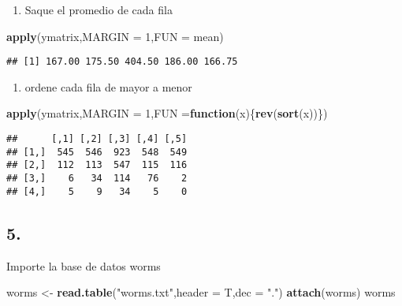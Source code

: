 \documentclass[]{article}
\newenvironment{Shaded}{\begin{snugshade}}{\end{snugshade}}
\newcommand{\KeywordTok}[1]{\textcolor[rgb]{0.13,0.29,0.53}{\textbf{#1}}}
\newcommand{\DataTypeTok}[1]{\textcolor[rgb]{0.13,0.29,0.53}{#1}}
\newcommand{\DecValTok}[1]{\textcolor[rgb]{0.00,0.00,0.81}{#1}}
\newcommand{\StringTok}[1]{\textcolor[rgb]{0.31,0.60,0.02}{#1}}
\newcommand{\ControlFlowTok}[1]{\textcolor[rgb]{0.13,0.29,0.53}{\textbf{#1}}}
\newcommand{\NormalTok}[1]{#1}
\providecommand{\tightlist}{%
  \setlength{\itemsep}{0pt}\setlength{\parskip}{0pt}}
\begin{document}
\begin{enumerate}
\def\labelenumi{\alph{enumi}.}
\tightlist
\item
  Saque el promedio de cada fila
\end{enumerate}

\begin{Shaded}
\begin{Highlighting}[]
\KeywordTok{apply}\NormalTok{(ymatrix,}\DataTypeTok{MARGIN =} \DecValTok{1}\NormalTok{,}\DataTypeTok{FUN =}\NormalTok{ mean)}
\end{Highlighting}
\end{Shaded}

\begin{verbatim}
## [1] 167.00 175.50 404.50 186.00 166.75
\end{verbatim}

\begin{enumerate}
\def\labelenumi{\alph{enumi}.}
\setcounter{enumi}{1}
\tightlist
\item
  ordene cada fila de mayor a menor
\end{enumerate}

\begin{Shaded}
\begin{Highlighting}[]
\KeywordTok{apply}\NormalTok{(ymatrix,}\DataTypeTok{MARGIN =} \DecValTok{1}\NormalTok{,}\DataTypeTok{FUN =}\ControlFlowTok{function}\NormalTok{(x)\{}\KeywordTok{rev}\NormalTok{(}\KeywordTok{sort}\NormalTok{(x))\})}
\end{Highlighting}
\end{Shaded}

\begin{verbatim}
##      [,1] [,2] [,3] [,4] [,5]
## [1,]  545  546  923  548  549
## [2,]  112  113  547  115  116
## [3,]    6   34  114   76    2
## [4,]    5    9   34    5    0
\end{verbatim}

\subsection{5.}\label{section-4}

Importe la base de datos worms

\begin{Shaded}
\begin{Highlighting}[]
\NormalTok{worms <-}\StringTok{ }\KeywordTok{read.table}\NormalTok{(}\StringTok{"worms.txt"}\NormalTok{,}\DataTypeTok{header =}\NormalTok{ T,}\DataTypeTok{dec =} \StringTok{"."}\NormalTok{)}
\KeywordTok{attach}\NormalTok{(worms)}
\NormalTok{worms}
\end{Highlighting}
\end{Shaded}
\end{document}
